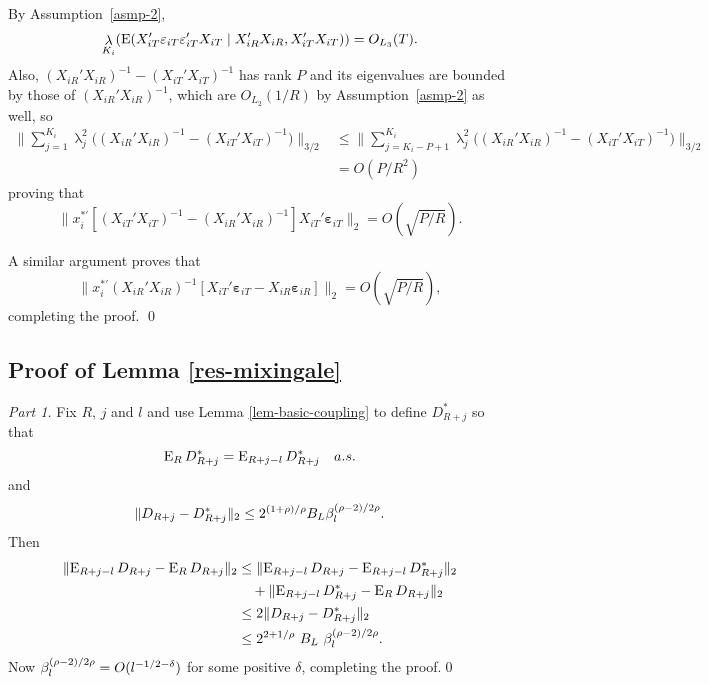 \documentclass[11pt]{article}
\newcommand{\e}{\varepsilon}
\newcommand{\eb}{\mathbf{\e}}
\DeclareMathOperator{\eigen}{\lambda}
\begin{document}
By Assumption~\ref{asmp-2},
\begin{equation*}
  \eigen_{K_i}(\E(X_{iT}' \eb_{iT} \eb_{iT}' X_{iT} \mid
  X_{iR}'X_{iR}, X_{iT}'X_{iT})) = O_{L_3}(T).
\end{equation*}
Also, $(X_{iR}'X_{iR})^{-1} - (X_{iT}'X_{iT})^{-1}$ has rank $P$ and
its eigenvalues are bounded by those of $(X_{iR}'X_{iR})^{-1}$, which
are $O_{L_2}(1/R)$ by Assumption~\ref{asmp-2} as well, so
\begin{align*}
  \Big\|\sum_{j=1}^{K_i}
  \eigen_j^2\big((X_{iR}'X_{iR})^{-1} - (X_{iT}'X_{iT})^{-1}\big)\Big\|_{3/2}
  &\leq \Big\|\sum_{j=K_i - P+1}^{K_i}
  \eigen_j^2\big((X_{iR}'X_{iR})^{-1} - (X_{iT}'X_{iT})^{-1}\big) \Big\|_{3/2} \\
  &= O(P/R^2)
\end{align*}
proving that
\begin{equation*}
  \| x_i^{*\prime} [(X_{iT}'X_{iT})^{-1} -
  (X_{iR}'X_{iR})^{-1}] X_{iT}' \eb_{iT} \|_2 = O(\sqrt{P/R}).
\end{equation*}

A similar argument proves that
\begin{equation*}
  \big\| x_i^{*\prime} (X_{iR}'X_{iR})^{-1}
  [X_{iT}'\eb_{iT} - X_{iR} \eb_{iR} ] \big\|_2 =  O(\sqrt{P/R}),
\end{equation*}
completing the proof.
\qed

\subsection*{Proof of Lemma \ref{res-mixingale}}
\noindent \textit{Part 1.} Fix $R$, $j$ and $l$ and use Lemma
\ref{lem-basic-coupling} to define $D_{R+j}^*$ so that
\[\operatorname{E}_RD_{R+j}^* = \operatorname{E}_{R+j-l} D_{R+j}^* \quad a.s. \]
and
\[\lVert D_{R+j} - D_{R+j}^* \rVert_2 \leq 2^{(1+\rho)/\rho} B_L \beta^{(\rho-2)/2\rho}_{l}.\]
Then
\begin{align*}
\lVert \operatorname{E}_{R+j-l} D_{R+j} - \operatorname{E}_R D_{R+j} \rVert_2 & \leq
\lVert \operatorname{E}_{R+j-l} D_{R+j} - \operatorname{E}_{R+j-l} D_{R+j}^* \rVert_2 \\
&\quad + \lVert
\operatorname{E}_{R+j-l} D_{R+j}^* - \operatorname{E}_R D_{R+j} \rVert_2 \\
&\leq 2 \lVert D_{R+j} - D_{R+j}^* \rVert_2 \\
&\leq 2^{2 + 1/\rho}\ B_L\ \beta^{(\rho-2)/2\rho}_{l}.
\end{align*}
Now $\beta^{(\rho-2)/2\rho}_{l} = O(l^{-1/2 - \delta})$ for some
positive $\delta$, completing the proof.\qed
\end{document}
